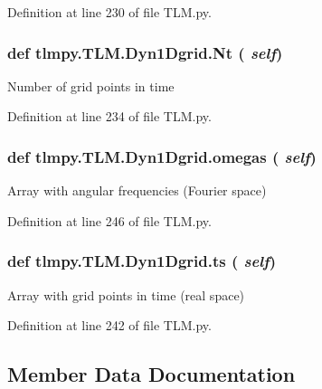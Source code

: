 Definition at line 230 of file TLM.py.\hypertarget{classtlmpy_1_1TLM_1_1Dyn1Dgrid_aa8f212baae863ff4ffc1c426d2494e2a}{
\subsubsection[{Nt}]{\setlength{\rightskip}{0pt plus 5cm}def tlmpy.TLM.Dyn1Dgrid.Nt ( {\em self})}}
\label{classtlmpy_1_1TLM_1_1Dyn1Dgrid_aa8f212baae863ff4ffc1c426d2494e2a}
\begin{DoxyVerb}Number of grid points in time\end{DoxyVerb}
 

Definition at line 234 of file TLM.py.\hypertarget{classtlmpy_1_1TLM_1_1Dyn1Dgrid_a7ab42e230ea0ad3c1c5ac16333aa7784}{
\subsubsection[{omegas}]{\setlength{\rightskip}{0pt plus 5cm}def tlmpy.TLM.Dyn1Dgrid.omegas ( {\em self})}}
\label{classtlmpy_1_1TLM_1_1Dyn1Dgrid_a7ab42e230ea0ad3c1c5ac16333aa7784}
\begin{DoxyVerb}Array with angular frequencies (Fourier space)\end{DoxyVerb}
 

Definition at line 246 of file TLM.py.\hypertarget{classtlmpy_1_1TLM_1_1Dyn1Dgrid_a8dd1ba32cb884d132286281f4b063e0d}{
\subsubsection[{ts}]{\setlength{\rightskip}{0pt plus 5cm}def tlmpy.TLM.Dyn1Dgrid.ts ( {\em self})}}
\label{classtlmpy_1_1TLM_1_1Dyn1Dgrid_a8dd1ba32cb884d132286281f4b063e0d}
\begin{DoxyVerb}Array with grid points in time (real space)\end{DoxyVerb}
 

Definition at line 242 of file TLM.py.

\subsection{Member Data Documentation}
\hypertarget{classtlmpy_1_1TLM_1_1Dyn1Dgrid_a48bfd2e785c78b828224a9f4c3d533b6}{
\subsubsection[{N}]{}}
\label{classtlmpy_1_1TLM_1_1Dyn1Dgrid_a48bfd2e785c78b828224a9f4c3d533b6}


